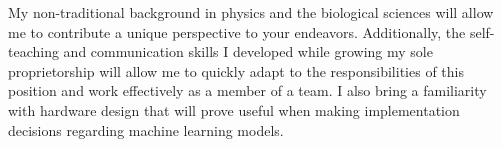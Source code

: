 \begin{cvletter}

	My non-traditional background in physics and the biological sciences
	will allow me to contribute a unique perspective to your endeavors.
	Additionally, the self-teaching and communication skills I developed
	while growing my sole proprietorship will allow me to quickly adapt
	to the responsibilities of this position and work effectively
	as a member of a team. I also bring a familiarity with hardware
	design that will prove useful when making implementation decisions
	regarding machine learning models.

\end{cvletter}
